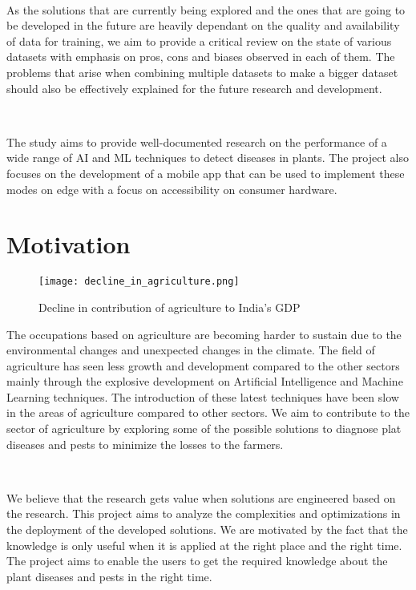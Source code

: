\

As the solutions that are currently being explored and the ones that are going to be developed in the future are heavily dependant on the quality and availability of data for training, we aim to provide a critical review on the state of various datasets with emphasis on pros, cons and biases observed in each of them. The problems that arise when combining multiple datasets to make a bigger dataset should also be effectively explained for the future research and development.

\ 

The study aims to provide well-documented research on the performance of a wide range of AI and ML techniques to detect diseases in plants. The project also focuses on the development of a mobile app that can be used to implement these modes on edge with a focus on accessibility on consumer hardware.


\section{Motivation}


\begin{figure}[h!]
    \centering
    \texttt{[image: decline\_in\_agriculture.png]}
    \caption{Decline in contribution of agriculture to India's GDP}
    \label{fig:system_architecture}
\end{figure}



The occupations based on agriculture are becoming harder to sustain due to the environmental changes and unexpected changes in the climate. The field of agriculture has seen less growth and development compared to the other sectors mainly through the explosive development on Artificial Intelligence and Machine Learning techniques. The introduction of these latest techniques have been slow in the areas of agriculture compared to other sectors. We aim to contribute to the sector of agriculture by exploring some of the possible solutions to diagnose plat diseases and pests to minimize the losses to the farmers.

\

We believe that the research gets value when solutions are engineered based on the research. This project aims to analyze the complexities and optimizations in the deployment of the developed solutions. We are motivated by the fact that the knowledge is only useful when it is applied at the right place and the right time. The project aims to enable the users to get the required knowledge about the plant diseases and pests in the right time.

